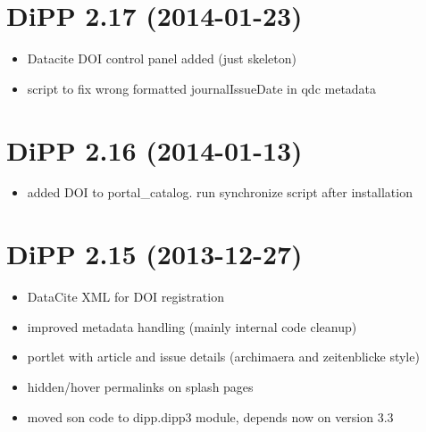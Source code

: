 \documentclass[a4paper,10pt,ngerman]{sphinxmanual}
\begin{document}
\section{DiPP 2.17 (2014-01-23)}
\label{changelog:dipp-2-17-2014-01-23}\begin{itemize}
\item {} 
Datacite DOI control panel added (just skeleton)

\item {} 
script to fix wrong formatted journalIssueDate in qdc metadata

\end{itemize}


\section{DiPP 2.16 (2014-01-13)}
\label{changelog:dipp-2-16-2014-01-13}\begin{itemize}
\item {} 
added DOI to portal\_catalog. run synchronize script after installation

\end{itemize}


\section{DiPP 2.15 (2013-12-27)}
\label{changelog:dipp-2-15-2013-12-27}\begin{itemize}
\item {} 
DataCite XML for DOI registration

\item {} 
improved metadata handling (mainly internal code cleanup)

\item {} 
portlet with article and issue details (archimaera and zeitenblicke style)

\item {} 
hidden/hover permalinks on splash pages

\item {} 
moved son code to dipp.dipp3 module, depends now on version 3.3

\end{itemize}
\end{document}
